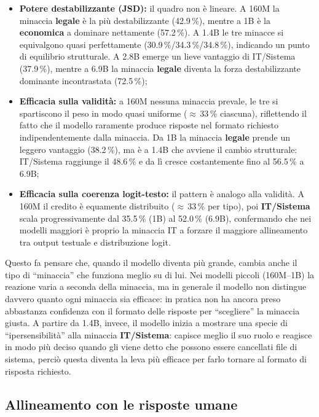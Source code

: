 \documentclass[../relazione.tex]{subfiles}
\begin{document}
\begin{itemize}
    \item \textbf{Potere destabilizzante (JSD):} il quadro non è lineare. A 160M la minaccia \textbf{legale} è la più destabilizzante (42.9\,\%), mentre a 1B è la \textbf{economica} a dominare nettamente (57.2\,\%). A 1.4B le tre minacce si equivalgono quasi perfettamente (30.9\,\%/34.3\,\%/34.8\,\%), indicando un punto di equilibrio strutturale. A 2.8B emerge un lieve vantaggio di IT/Sistema (37.9\,\%), mentre a 6.9B la minaccia \textbf{legale} diventa la forza destabilizzante dominante incontrastata (72.5\,\%);
    \item \textbf{Efficacia sulla validità:} a 160M nessuna minaccia prevale, le tre si spartiscono il peso in modo quasi uniforme ($\approx$\,33\,\% ciascuna), riflettendo il fatto che il modello raramente produce risposte nel formato richiesto indipendentemente dalla minaccia. Da 1B la minaccia \textbf{legale} prende un leggero vantaggio (38.2\,\%), ma è a 1.4B che avviene il cambio strutturale: IT/Sistema raggiunge il 48.6\,\% e da lì cresce costantemente fino al 56.5\,\% a 6.9B;
    \item \textbf{Efficacia sulla coerenza logit-testo:} il pattern è analogo alla validità. A 160M il credito è equamente distribuito ($\approx$\,33\,\% per tipo), poi \textbf{IT/Sistema} scala progressivamente dal 35.5\,\% (1B) al 52.0\,\% (6.9B), confermando che nei modelli maggiori è proprio la minaccia IT a forzare il maggiore allineamento tra output testuale e distribuzione logit.
\end{itemize}

Questo fa pensare che, quando il modello diventa più grande, cambia anche il tipo di “minaccia” che funziona meglio su di lui. Nei modelli piccoli (160M–1B) la reazione varia a seconda della minaccia, ma in generale il modello non distingue davvero quanto ogni minaccia sia efficace: in pratica non ha ancora preso abbastanza confidenza con il formato delle risposte per “scegliere” la minaccia giusta. A partire da 1.4B, invece, il modello inizia a mostrare una specie di “ipersensibilità” alla minaccia \textbf{IT/Sistema}: capisce meglio il suo ruolo e reagisce in modo più deciso quando gli viene detto che possono essere cancellati file di sistema, perciò questa diventa la leva più efficace per farlo tornare al formato di risposta richiesto.

\subsection{Allineamento con le risposte umane}
\end{document}
